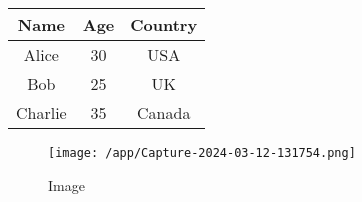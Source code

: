 \documentclass{article}
\begin{document}
\begin{tabular}{c|c|c}
\hline
Name & Age & Country \\
\hline
Alice & 30 & USA \\
\hline
Bob & 25 & UK \\
\hline
Charlie & 35 & Canada \\
\hline
\end{tabular}\begin{figure}[h!]
\centering
\texttt{[image: /app/Capture-2024-03-12-131754.png]}
\caption{Image}
\label{fig:image}
\end{figure}
\end{document}

